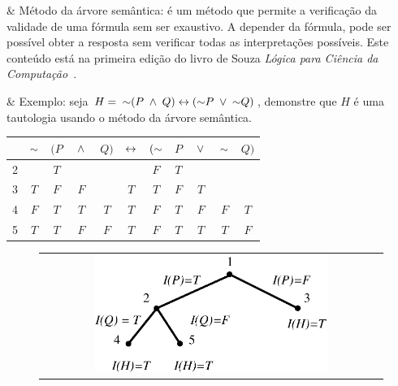 \begin{easylist}
  & Método da árvore semântica: é um método que permite a verificação da validade de uma fórmula sem ser exaustivo. A depender da fórmula, pode ser possível obter a resposta sem verificar todas as interpretações possíveis. Este conteúdo está na primeira edição do livro de Souza \textit{Lógica para Ciência da Computação}~\cite{souza_logica_1}.

  
  & Exemplo: seja $H = \; \mathord{\sim}(P \;\land\; Q) \leftrightarrow (\mathord{\sim} P \;\lor\; \mathord{\sim} Q)$, demonstre que $H$ é uma tautologia usando o método da árvore semântica.
\end{easylist}

\begin{center}
  \begin{tabular}{ c|cccccccccc }
        & $\mathord{\sim}$ & $(P$ & $\;\land\;$ & $Q)$ & $\leftrightarrow$ & $(\mathord{\sim}$ & $P$ & $\;\lor\;$ & $\mathord{\sim}$ & $Q)$ \\
    \hline
      2 &        & $T$  &        &      &        & $F$     & $T$ &       &        &      \\
    \hline
      3 & $T$    & $F$  & $F$    &      & $T$    & $T$     & $F$ & $T$   &        &      \\
    \hline
      4 & $F$    & $T$  & $T$    & $T$  & $T$    & $F$     & $T$ & $F$   & $F$    & $T$  \\
    \hline
      5 & $T$    & $T$  & $F$    & $F$  & $T$    & $F$     & $T$ & $T$   & $T$    & $F$  \\
  \end{tabular}
\end{center}

\begin{figure}[h!]
  \begin{center}
    \begin{tabular}{c}
      \includegraphics[width=0.7\textwidth]{images/04/tree_01.eps}
    \end{tabular}
  \end{center}
\end{figure}

